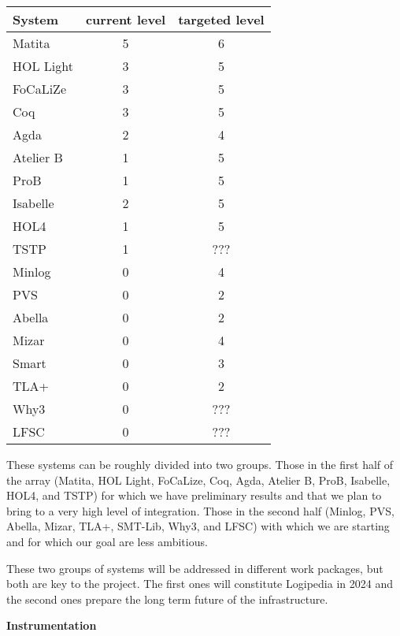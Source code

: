 \begin{center}
\begin{tabular}{|l|c|c|}
\hline
System & current level & targeted level\\
\hline
{\sf Matita} & 5 & 6\\
\hline
{\sf HOL Light} & 3 & 5\\
\hline
{\sf FoCaLiZe} & 3 & 5\\
\hline
{\sf Coq} & 3 & 5\\
\hline
{\sf Agda} & 2 & 4\\
\hline
{\sf Atelier B} & 1 & 5\\
\hline
{\sf ProB} & 1 & 5\\
\hline
{\sf Isabelle} & 2 & 5\\
\hline
{\sf HOL4} & 1 & 5\\
\hline
{\sf TSTP} & 1 & {\color{red} ???}\\
\hline
{\sf Minlog} & 0 & 4\\
\hline
{\sf PVS} & 0 & 2\\
\hline
{\sf Abella} & 0 & 2\\
\hline
{\sf Mizar} & 0 & 4\\
\hline
{\sf Smart} & 0 & 3\\
\hline
{\sf TLA+} & 0 & 2\\
\hline
{\sf Why3} & 0 & {\color{red} ???}\\
\hline
{\sf LFSC} & 0 & {\color{red} ???}\\
\hline
\end{tabular}
\end{center}

These systems can be roughly divided into two groups. Those in the
first half of the array ({\sf Matita}, {\sf HOL Light}, {\sf
  FoCaLize}, {\sf Coq}, {\sf Agda}, {\sf Atelier B}, ProB, {\sf Isabelle},
{\sf HOL4}, and {\sf TSTP}) for which we have preliminary results and
that we plan to bring to a very high level of integration. Those in
the second half ({\sf Minlog}, {\sf PVS}, {\sf Abella}, {\sf Mizar},
{\sf TLA+}, {\sf SMT-Lib}, {\sf Why3}, and {\sf LFSC}) with which we
are starting and for which our goal are less ambitious.

These two groups of systems will be addressed in different
work packages, but both are key to the project. The first ones will
constitute {\sf Logipedia} in 2024 and the second ones prepare the
long term future of the infrastructure.

\bigskip

\noindent
{\bf Instrumentation}

